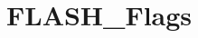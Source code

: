 \hypertarget{group___f_l_a_s_h___flags}{\section{F\-L\-A\-S\-H\-\_\-\-Flags}
\label{group___f_l_a_s_h___flags}
}
